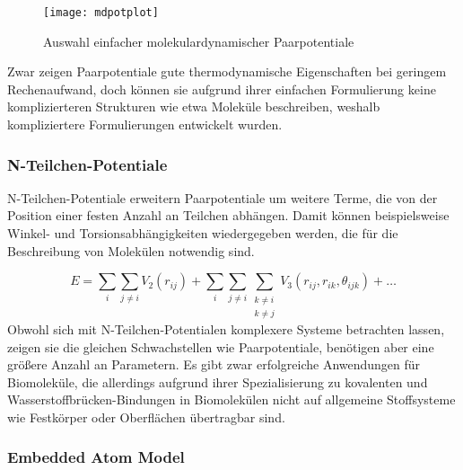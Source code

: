 \begin{figure}[btp]
  \centering
  \texttt{[image: mdpotplot]}
  \caption{Auswahl einfacher molekulardynamischer Paarpotentiale}
  \label{fig:mdpairpotentials}
\end{figure}

Zwar zeigen Paarpotentiale gute thermodynamische Eigenschaften bei geringem Rechenaufwand, doch können sie aufgrund ihrer einfachen Formulierung keine komplizierteren Strukturen wie etwa Moleküle beschreiben, weshalb kompliziertere Formulierungen entwickelt wurden.

\subsubsection{N-Teilchen-Potentiale}

N-Teilchen-Potentiale erweitern Paarpotentiale um weitere Terme, die von der Position einer festen Anzahl an Teilchen abhängen.
Damit können beispielsweise Winkel- und Torsionsabhängigkeiten wiedergegeben werden, die für die Beschreibung von Molekülen notwendig sind.

\begin{equation}
  E = \sum_i\sum_{j \neq i}{V_2\left(r_{ij}\right)} + \sum_i\sum_{j \neq i}\sum_{\substack{k \neq i \\ k \neq j}}{V_3\left(r_{ij}, r_{ik}, \theta_{ijk}\right)} + \dots
\end{equation}
Obwohl sich mit N-Teilchen-Potentialen komplexere Systeme betrachten lassen, zeigen sie die gleichen Schwachstellen wie Paarpotentiale, benötigen aber eine größere Anzahl an Parametern.
Es gibt zwar erfolgreiche Anwendungen für Biomoleküle\cite{case_amber_2005,brooks_charmm:_1983,brooks_charmm:_2009,berendsen_gromacs:_1995,hess_gromacs_2008}, die allerdings aufgrund ihrer Spezialisierung zu kovalenten und Wasserstoffbrücken-Bindungen in Biomolekülen nicht auf allgemeine Stoffsysteme wie Festkörper oder Oberflächen übertragbar sind.

\subsubsection{Embedded Atom Model}

